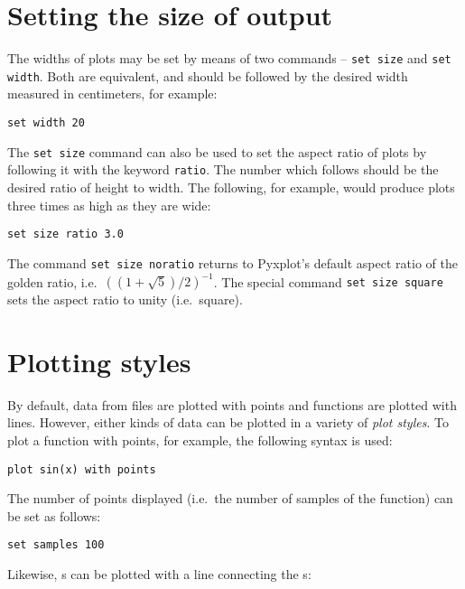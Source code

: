 \section{Setting the size of output}

The widths of plots may be set by means of two commands -- {\tt set
size} and {\tt set width}. Both are
equivalent, and should be followed by the desired width measured in
centimeters, for example:

\begin{verbatim}
set width 20
\end{verbatim}

The {\tt set size} command can also be used to set the aspect ratio of plots by
following it with the keyword {\tt ratio}. The number
which follows should be the desired ratio of height to width. The following,
for example, would produce plots three times as high as they are wide:

\begin{verbatim}
set size ratio 3.0
\end{verbatim}

\noindent The command {\tt set size noratio} returns to Pyxplot's default
aspect ratio of the golden ratio, i.e.\ $\left((1+\sqrt{5})/2\right)^{-1}$. The
special command {\tt set size square} sets the aspect
ratio to unity (i.e.\ square).

\section{Plotting styles}
\label{sec:plotting_styles}

By default, data from files are plotted with points and functions are plotted
with lines. However, either kinds of data can be plotted in a variety of {\it
plot styles}.  To plot a function with points, for example, the following
syntax is used:

\begin{verbatim}
plot sin(x) with points
\end{verbatim}

\noindent The number of points displayed (i.e.\ the number of samples of the
function) can be set as follows:

\begin{verbatim}
set samples 100
\end{verbatim}

\noindent Likewise, \datafile s can be plotted with a line connecting the
\datapoint s:

